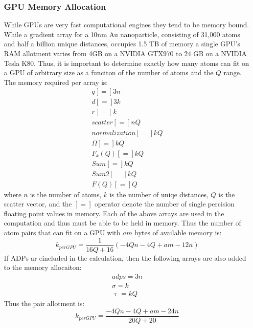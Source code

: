 \subsubsection{GPU Memory Allocation}
While GPUs are very fast computational engines they tend to be memory bound.
While a gradient array for a 10nm Au nanoparticle, consisting of 31,000 atoms and half a billion unique distances, occupies 1.5 TB of memory a single GPU's RAM allotment varies from 4GB on a NVIDIA GTX970 to 24 GB on a NVIDIA Tesla K80.
Thus, it is important to determine exactly how many atoms can fit on a GPU of arbitrary size as a funciton of the number of atoms and the $Q$ range.
The memory required per array is:
\begin{eqnarray}
    q [=] 3n\\
    d [=] 3k\\
    r [=] k\\
    scatter [=] nQ\\
    normalization [=] kQ\\
    \Omega [=] kQ\\
    F_{k}(Q) [=] kQ\\
    Sum [=] kQ\\
    Sum2 [=] kQ\\
    F(Q) [=] Q
\end{eqnarray}
where $n$ is the number of atoms, $k$ is the number of uniqe distances, $Q$ is the scatter vector, and the $[=]$ operator denote the number of single percision floating point values in memory.
Each of the above arrays are used in the computation and thus must be able to be held in memory.
Thus the number of atom pairs that can fit on a GPU with $am$ bytes of available memory is:
\begin{equation}
    k_{per GPU} = \frac{1}{16 Q + 16} \left(- 4 Q n - 4 Q + am - 12 n\right)
\end{equation}
If ADPs ar eincluded in the calculation, then the following arrays are also added to the memory allocaiton:
\begin{eqnarray}
    adps = 3n\\
    \sigma = k\\
    \uptau = kQ
\end{eqnarray}
Thus the pair allotment is:
\begin{equation}
    k_{per GPU} = \frac{- 4 Q n - 4 Q + am - 24 n}{20 Q + 20}
\end{equation}

